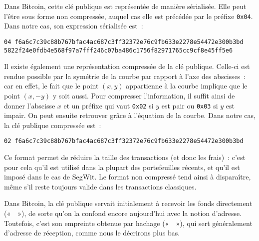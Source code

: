 Dans Bitcoin, cette clé publique est représentée de manière sérialisée. Elle peut l'être sous forme non compressée, auquel cas elle est précédée par le préfixe \texttt{0x04}. Dans notre cas, son expression sérialisée est~:

\begin{Verbatim}[fontsize=\scriptsize]
04 f6a6c7c39c88b767bfac4ac687c3ff32372e76c9fb633e2278e54472e300b3bd
5822f24e0fdb4e568f97a7fff246c07ba486c1756f82971765cc9cf8e45ff5e6
\end{Verbatim}

Il existe également une représentation compressée de la clé publique. Celle-ci est rendue possible par la symétrie de la courbe par rapport à l'axe des abscisses~: car en effet, le fait que le point $(x, y)$ appartienne à la courbe implique que le point $(x, - y)$ y soit aussi. Pour compresser l'information, il suffit ainsi de donner l'abscisse $x$ et un préfixe qui vaut \texttt{0x02} si $y$ est pair ou \texttt{0x03} si $y$ est impair. On peut ensuite retrouver grâce à l'équation de la courbe. Dans notre cas, la clé publique compressée est~:

\begin{Verbatim}[fontsize=\scriptsize]
02 f6a6c7c39c88b767bfac4ac687c3ff32372e76c9fb633e2278e54472e300b3bd
\end{Verbatim}

Ce format permet de réduire la taille des transactions (et donc les frais)~: c'est pour cela qu'il est utilisé dans la plupart des portefeuilles récents, et qu'il est imposé dans le cas de SegWit. Le format non compressé tend ainsi à disparaître, même s'il reste toujours valide dans les transactions classiques.

Dans Bitcoin, la clé publique servait initialement à recevoir les fonds directement («~~»), de sorte qu'on la confond encore aujourd'hui avec la notion d'adresse. Toutefois, c'est son empreinte obtenue par hachage («~~»), qui sert généralement d'adresse de réception, comme nous le décrirons plus bas.


